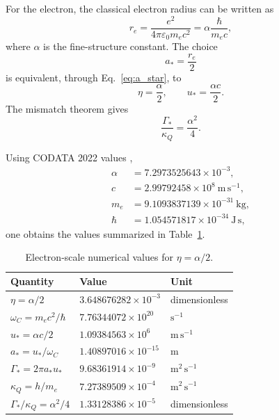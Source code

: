 \documentclass[11pt,a4paper]{article}
\newcommand{\kappaQ}{\kappa_{Q}}
\newcommand{\GammaStar}{\Gamma_{*}}
\newcommand{\uStar}{u_{*}}
\newcommand{\aStar}{a_{*}}
\newcommand{\re}{r_{e}}
\begin{document}
For the electron, the classical electron radius can be written as
\begin{equation}
    \re=\frac{e^2}{4\pi\varepsilon_0m_ec^2}
    =
    \alpha\frac{\hbar}{m_ec},
    \label{eq:classical_electron_radius}
\end{equation}
where $\alpha$ is the fine-structure constant. The choice
\begin{equation}
    \aStar=\frac{\re}{2}
\end{equation}
is equivalent, through Eq.~\eqref{eq:a_star}, to
\begin{equation}
    \eta=\frac{\alpha}{2},
    \qquad
    \uStar=\frac{\alpha c}{2}.
\end{equation}
The mismatch theorem gives
\begin{equation}
    \frac{\GammaStar}{\kappaQ}
    =
    \frac{\alpha^2}{4}.
    \label{eq:alpha_mismatch}
\end{equation}

Using CODATA 2022 values \cite{CODATA2022},
\begin{align}
    \alpha &= 7.2973525643\times10^{-3},\\
    c &= 2.99792458\times10^8\ \mathrm{m\,s^{-1}},\\
    m_e &= 9.1093837139\times10^{-31}\ \mathrm{kg},\\
    \hbar &= 1.054571817\times10^{-34}\ \mathrm{J\,s},
\end{align}
one obtains the values summarized in Table~\ref{tab:numerics}.

\begin{table}[h]
\centering
\caption{Electron-scale numerical values for $\eta=\alpha/2$.}
\label{tab:numerics}
\begin{tabular}{lll}
\toprule
Quantity & Value & Unit \\
\midrule
$\eta=\alpha/2$ & $3.648676282\times10^{-3}$ & dimensionless \\
$\omega_C=m_ec^2/\hbar$ & $7.76344072\times10^{20}$ & $\mathrm{s^{-1}}$ \\
$u_* = \alpha c/2$ & $1.09384563\times10^{6}$ & $\mathrm{m\,s^{-1}}$ \\
$a_* = u_*/\omega_C$ & $1.40897016\times10^{-15}$ & $\mathrm{m}$ \\
$\Gamma_*=2\pi a_*u_*$ & $9.68361914\times10^{-9}$ & $\mathrm{m^2\,s^{-1}}$ \\
$\kappa_Q=h/m_e$ & $7.27389509\times10^{-4}$ & $\mathrm{m^2\,s^{-1}}$ \\
$\Gamma_*/\kappa_Q=\alpha^2/4$ & $1.33128386\times10^{-5}$ & dimensionless \\
\bottomrule
\end{tabular}
\end{table}
\end{document}
